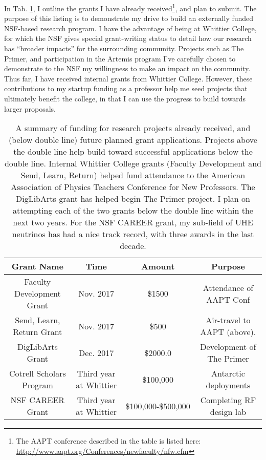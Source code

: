 \documentclass[../../main.tex]{subfiles}
\begin{document}
In Tab. \ref{tab:fund}, I outline the grants I have already received\footnote{The AAPT conference described in the table is listed here: \url{http://www.aapt.org/Conferences/newfaculty/nfw.cfm}}, and plan to submit.  The purpose of this listing is to demonstrate my drive to build an externally funded NSF-based research program.  I have the advantage of being at Whittier College, for which the NSF gives special grant-writing status to detail how our research has ``broader impacts'' for the surrounding community.  Projects such as The Primer, and participation in the Artemis program I've carefully chosen to demonstrate to the NSF my willingness to make an impact on the community.  Thus far, I have received internal grants from Whittier College.  However, these contributions to my startup funding as a professor help me seed projects that ultimately benefit the college, in that I can use the progress to build towards larger proposals.

\begin{table}
\small
\centering
\begin{tabular}{|c|c|c|c|}
\hline \hline
Grant Name & Time & Amount & Purpose \\ \hline
Faculty Development Grant & Nov. 2017 & \$1500 & Attendance of AAPT Conf \\ \hline
Send, Learn, Return Grant & Nov. 2017 & \$500 & Air-travel to AAPT (above). \\ \hline
DigLibArts Grant & Dec. 2017 & \$2000.0 & Development of The Primer \\ \hline \hline
Cotrell Scholars Program & Third year at Whittier & \$100,000 & Antarctic deployments \\ \hline
NSF CAREER Grant & Third year at Whittier & \$100,000-\$500,000 & Completing RF design lab \\ \hline
\hline
\end{tabular}
\caption{\label{tab:fund} A summary of funding for research projects already received, and (below double line) future planned grant applications.  Projects above the double line help build toward successful applications below the double line. Internal Whittier College grants (Faculty Development and Send, Learn, Return) helped fund attendance to the American Association of Physics Teachers Conference for New Professors.  The DigLibArts grant has helped begin The Primer project.  I plan on attempting each of the two grants below the double line within the next two years.  For the NSF CAREER grant, my sub-field of UHE neutrinos has had a nice track record, with three awards in the last decade.}
\end{table}
\end{document}
